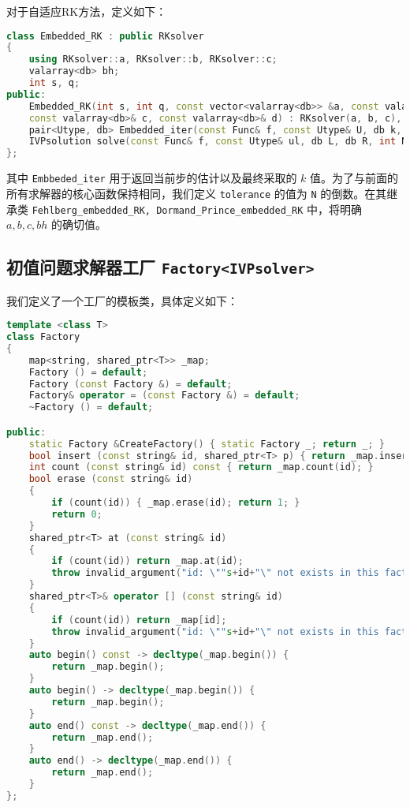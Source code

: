 \documentclass[lang=cn,a4paper,newtx,bibend=bibtex]{elegantpaper}
\begin{document}
对于自适应RK方法，定义如下：
\begin{lstlisting}[language=C++]
class Embedded_RK : public RKsolver
{
    using RKsolver::a, RKsolver::b, RKsolver::c;
    valarray<db> bh;
    int s, q;
public:
    Embedded_RK(int s, int q, const vector<valarray<db>> &a, const valarray<db>& b, 
    const valarray<db>& c, const valarray<db>& d) : RKsolver(a, b, c), bh(d), s(s), q(q) {}
    pair<Utype, db> Embedded_iter(const Func& f, const Utype& U, db k, db tn, db tolerance = 1e-6) const;
    IVPsolution solve(const Func& f, const Utype& ul, db L, db R, int N) const;
};
\end{lstlisting}
其中 \lstinline{Embbeded_iter} 用于返回当前步的估计以及最终采取的 $k$ 值。为了与前面的所有求解器的核心函数保持相同，我们定义 \texttt{tolerance} 的值为 \texttt{N} 的倒数。在其继承类 \lstinline{Fehlberg_embedded_RK, Dormand_Prince_embedded_RK} 中，将明确 $a,b,c,bh$ 的确切值。

\subsection{初值问题求解器工厂 \lstinline{Factory<IVPsolver>}}

我们定义了一个工厂的模板类，具体定义如下：
\begin{lstlisting}[language=C++]
template <class T>
class Factory
{
    map<string, shared_ptr<T>> _map;
	Factory () = default;
	Factory (const Factory &) = default;
	Factory& operator = (const Factory &) = default;
    ~Factory () = default;

public:
    static Factory &CreateFactory() { static Factory _; return _; }
    bool insert (const string& id, shared_ptr<T> p) { return _map.insert({id, p}).second; }
    int count (const string& id) const { return _map.count(id); }
    bool erase (const string& id)
    {
        if (count(id)) { _map.erase(id); return 1; }
        return 0;
    }
    shared_ptr<T> at (const string& id)
    {
        if (count(id)) return _map.at(id);
        throw invalid_argument("id: \""s+id+"\" not exists in this factory."s);
    }
    shared_ptr<T>& operator [] (const string& id)
    {
        if (count(id)) return _map[id];
        throw invalid_argument("id: \""s+id+"\" not exists in this factory."s);
    }
    auto begin() const -> decltype(_map.begin()) {
        return _map.begin();
    }
    auto begin() -> decltype(_map.begin()) {
        return _map.begin();
    }
    auto end() const -> decltype(_map.end()) {
        return _map.end();
    }
    auto end() -> decltype(_map.end()) {
        return _map.end();
    }
};
\end{lstlisting}
\end{document}
